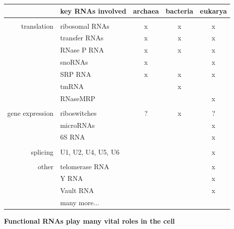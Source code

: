 \documentclass[landscape]{slides}
\begin{document}
\begin{slide}
\begin{slide}
\small
\begin{center}
\begin{tabular}{r|l|ccc}
 & key RNAs involved & archaea & bacteria & eukarya \\ \hline
 & \\ 
translation & ribosomal RNAs & x & x & x \\
            & transfer RNAs  & x & x & x \\
            & RNase P RNA    & x & x & x \\
            & snoRNAs        & x &   & x \\ 
            & SRP RNA        & x & x & x \\ 
            & tmRNA          &   & x &   \\ 
            & RNaseMRP       &   &   & x \\ 
            &  \\ 
gene expression & riboswitches & ? & x & ? \\
                & microRNAs &  & & x \\
                & 6S RNA & & & x\\ 
                & \\ 
splicing        & U1, U2, U4, U5, U6 & & & x \\ 
                & \\
other           & telomerase RNA & & & x \\ 
                & Y RNA          & & & x \\
                & Vault RNA      & & & x \\
                & many more... & & & \\ 
\end{tabular}
\end{center}

\vfill
\end{slide}
\begin{slide}
\begin{center}
\textbf{Functional RNAs play many vital roles in the cell}
\end{center}
\medskip


\end{slide}
\end{slide}
\end{document}
